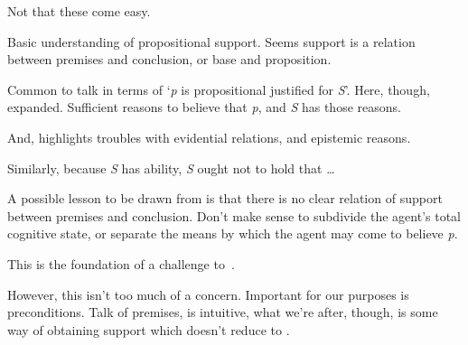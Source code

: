 \begin{note}
  Not that these come easy.

  Basic understanding of propositional support.
  Seems support is a relation between premises and conclusion, or base and proposition.

  Common to talk in terms of `\emph{p} is propositional justified for \emph{S}'.
  Here, though, expanded.
  Sufficient reasons to believe that \emph{p}, and \emph{S} has those reasons.

  And, \textcite{Silva:2020aa} highlights troubles with evidential relations, and epistemic reasons.

  Similarly, because \emph{S} has ability, \emph{S} ought not to hold that \dots
\end{note}

\begin{note}
  A possible lesson to be drawn from \citeauthor{Goldman:1979ui} is that there is no clear relation of support between premises and conclusion.
  Don't make sense to subdivide the agent's total cognitive state, or separate the means by which the agent may come to believe \emph{p}.

  This is the foundation of a challenge to~\bP{}.

  However, this isn't too much of a concern.
  Important for our purposes is preconditions.
  Talk of premises, is intuitive, what we're after, though, is some way of obtaining support which doesn't reduce to \AR{}.
\end{note}

